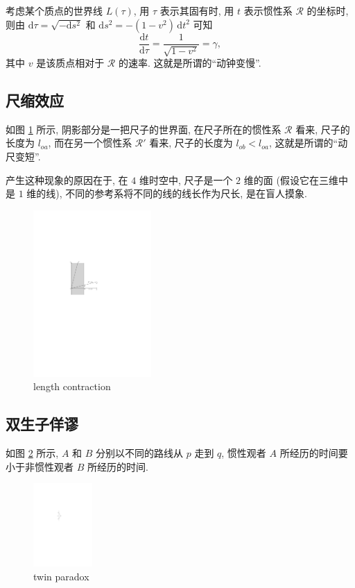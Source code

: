 考虑某个质点的世界线 $ L(\tau) $, 用 $ \tau $ 表示其固有时, 用 $ t $ 表示惯性系 $ \mathcal{R} $ 的坐标时, 则由 $ \mathrm{d}\tau=\sqrt{-\mathrm{d}s^2} $ 和 $ \mathrm{d}s^2=-(1-v^2)\,\mathrm{d}t^2 $ 可知
\[ \frac{\mathrm{d}t}{\mathrm{d}\tau}=\frac{1}{\sqrt{1-v^2}}=\gamma, \]
其中 $ v $ 是该质点相对于 $ \mathcal{R} $ 的速率. 这就是所谓的``动钟变慢''.

\subsection{尺缩效应}
如图 \ref{length contraction} 所示, 阴影部分是一把尺子的世界面, 在尺子所在的惯性系 $ \mathcal{R} $ 看来, 尺子的长度为 $ l_{oa} $, 而在另一个惯性系 $ \mathcal{R'} $ 看来, 尺子的长度为 $ l_{ob}<l_{oa} $, 这就是所谓的``动尺变短''.

产生这种现象的原因在于, 在 $ 4 $ 维时空中, 尺子是一个 $ 2 $ 维的面 (假设它在三维中是 $ 1 $ 维的线), 不同的参考系将不同的线的线长作为尺长, 是在盲人摸象.
\begin{figure}[H]
    \centering
    \includegraphics[width=0.4\textwidth]{pic/length contraction.pdf}
    \caption{length contraction}
    \label{length contraction}
\end{figure}

\subsection{双生子佯谬}
如图 \ref{twin paradox} 所示, $ A $ 和 $ B $ 分别以不同的路线从 $ p $ 走到 $ q $, 惯性观者 $ A $ 所经历的时间要小于非惯性观者 $ B $ 所经历的时间.

\begin{figure}[H]
    \centering
    \includegraphics[width=0.2\textwidth]{pic/twin paradox.pdf}
    \caption{twin paradox}
    \label{twin paradox}
\end{figure}

